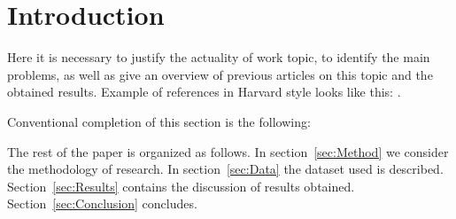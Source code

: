 \section{Introduction}
\label{sec:Intro}

Here it is necessary to justify the actuality of work topic, to identify the main problems, as well as give an overview of previous articles on this topic and the obtained results. Example of references in Harvard style looks like this: \citet{bib:AuthorYear}.

Conventional completion of this section is the following:

The rest of the paper is organized as follows. In section~\ref{sec:Method} we consider the methodology of research. In section~\ref{sec:Data} the dataset used is described. Section~\ref{sec:Results} contains the discussion of results obtained. Section~\ref{sec:Conclusion} concludes.
